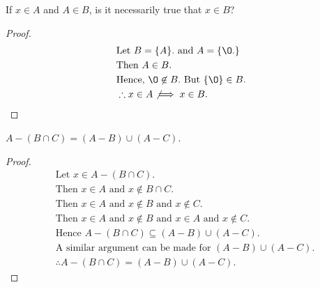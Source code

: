 \begin{question}
  \begin{subquestion}
    If $x \in A$ and $A \in B$, is it necessarily true that $x \in B$?
  \end{subquestion}
  \begin{proof}
    \begin{align*}
      & \text{Let } B = \{ A \}. \text{ and } A = \{ \O. \} \\
      & \text{Then } A \in B. \\
      & \text{Hence, } \O \not \in B. \text { But } \{\O\} \in B. \\
      & \therefore x \in A \not \implies x \in B.
    \end{align*}
  \end{proof}

\end{question}

\begin{question}
  $A - (B \cap C) = (A - B) \cup (A - C)$.
\end{question}
\begin{proof}
  \begin{align*}
    & \text{Let } x \in A - (B \cap C). \\
    & \text{Then } x \in A \text{ and } x \not \in B \cap C. \\
    & \text{Then } x \in A \text{ and } x \not \in B \text{ and } x \not \in C. \\
    & \text{Then } x \in A \text{ and } x \not \in B \text{ and } x \in A \text{ and } x \not \in C. \\
    & \text{Hence } A - (B \cap C) \subseteq (A - B) \cup (A - C). \\
    & \text{A similar argument can be made for } (A - B) \cup (A - C). \\
    & \therefore A - (B \cap C) = (A - B) \cup (A - C).
  \end{align*}
\end{proof}

